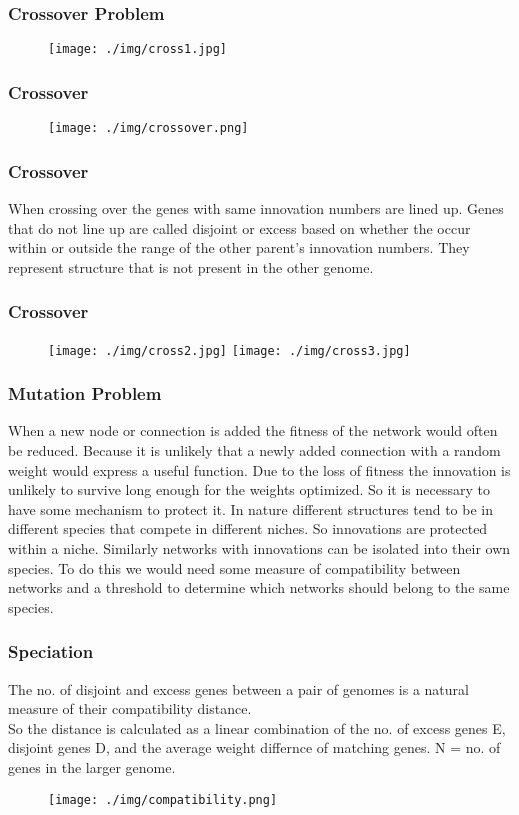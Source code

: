 \documentclass{beamer}
\begin{document}
\begin{frame}
\frametitle{Crossover Problem}
\begin{figure}
\texttt{[image: ./img/cross1.jpg]}
\end{figure}
\end{frame}

\begin{frame}
\frametitle{Crossover}
\begin{figure}
\texttt{[image: ./img/crossover.png]}
\end{figure}
\end{frame}

\begin{frame}
\frametitle{Crossover}
When crossing over the genes with same innovation numbers are lined up. Genes that do not line up are called disjoint or excess based on whether the occur within or outside the range of the other parent's innovation numbers. They represent structure that is not present in the other genome.
\end{frame}

\begin{frame}
\frametitle{Crossover}
\begin{figure}
\texttt{[image: ./img/cross2.jpg]}
\texttt{[image: ./img/cross3.jpg]}
\end{figure}
\end{frame}


\begin{frame}
\frametitle{Mutation Problem}
When a new node or connection is added the fitness of the network would often be reduced. Because it is unlikely that a newly added connection with a random weight would express a useful function. Due to the loss of fitness the innovation is unlikely to survive long enough for the weights optimized. So it is necessary to have some mechanism to protect it.
\bigbreak
In nature different structures tend to be in different species that compete in different niches. So innovations are protected within a niche. Similarly networks with innovations can be isolated into their own species.
\bigbreak
To do this we would need some measure of compatibility between networks and a threshold to determine which networks should belong to the same species.
\end{frame}

\begin{frame}
\frametitle{Speciation}
The no. of disjoint and excess genes between a pair of genomes is a natural measure of their compatibility distance.
\\
So the distance is calculated as a linear combination of the no. of excess genes E, disjoint genes D, and the average weight differnce of matching genes. N = no. of genes in the larger genome.
\\
\begin{figure}
\texttt{[image: ./img/compatibility.png]}
\end{figure}
\end{frame}
\end{document}
